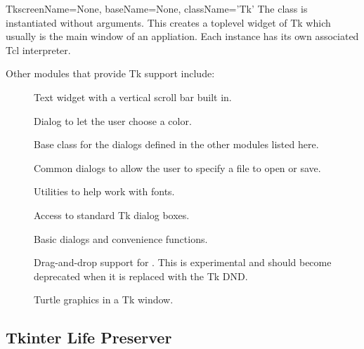 \begin{classdesc}{Tk}{screenName=None, baseName=None, className='Tk'}
The  class is instantiated without arguments.
This creates a toplevel widget of Tk which usually is the main window
of an appliation. Each instance has its own associated Tcl interpreter.
\end{classdesc}

Other modules that provide Tk support include:

\begin{description}

\item[]
Text widget with a vertical scroll bar built in.

\item[]
Dialog to let the user choose a color.

\item[]
Base class for the dialogs defined in the other modules listed here.

\item[]
Common dialogs to allow the user to specify a file to open or save.

\item[]
Utilities to help work with fonts.

\item[]
Access to standard Tk dialog boxes.

\item[]
Basic dialogs and convenience functions.

\item[]
Drag-and-drop support for .
This is experimental and should become deprecated when it is replaced 
with the Tk DND.

\item[]
Turtle graphics in a Tk window.

\end{description}

\subsection{Tkinter Life Preserver}

